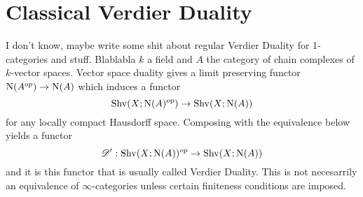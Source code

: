 \documentclass[../thesis.tex]{subfiles}
\begin{document}
\section{Classical Verdier Duality}
I don't know, maybe write some shit about regular Verdier Duality for 1-categories and stuff.
Blablabla $k$ a field and $A$ the category of chain complexes of $k$-vector spaces.
Vector space duality gives a limit preserving functor $\mathrm{N}(A^{op}) \to \mathrm{N}(A)$ which induces a functor
\[
    \mathrm{Shv}(X;\mathrm{N}(A)^{op}) \to \mathrm{Shv}(X;\mathrm{N}(A))
\]
for any locally compact Hausdorff space.
Composing with the equivalence below yields a functor
\[
    \mathscr{D}': \mathrm{Shv}(X;\mathrm{N}(A))^{op} \to \mathrm{Shv}(X;\mathrm{N}(A))
\]
and it is this functor that is usually called Verdier Duality. This is not necesarrily an equivalence of $\infty$-categories unless certain finiteness conditions are imposed.
\end{document}
